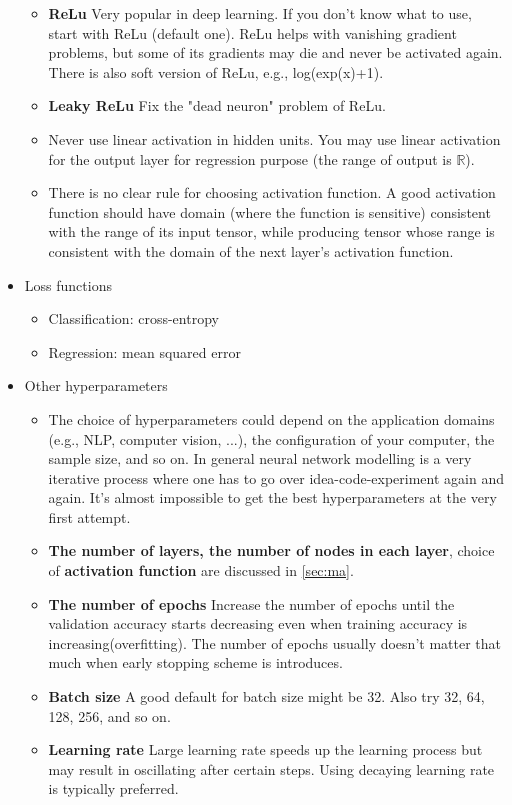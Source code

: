\begin{itemize}
\begin{itemize}
    \item \textbf{ReLu} Very popular in deep learning.  If you don't know what to use, start with ReLu (default one). ReLu helps with vanishing gradient problems, but some of its gradients may die and never be activated again. There is also soft version of ReLu, e.g., log(exp(x)+1).  
    \item \textbf{Leaky ReLu} Fix the "dead neuron" problem of ReLu. 
    \item Never use linear activation in hidden units. You may use linear activation for the output layer for regression purpose (the range of output is $\mathbb{R}$).
    \item There is no clear rule for choosing activation function. A good activation function should have domain (where the function is sensitive) consistent with the range of its input tensor, while producing tensor whose range is consistent with the domain of the next layer's activation function. 
\end{itemize}
\item Loss functions
\begin{itemize}
    \item Classification: cross-entropy
    \item Regression: mean squared error
\end{itemize}
\item Other hyperparameters
\begin{itemize}
    \item The choice of hyperparameters could depend on the application domains (e.g., NLP, computer vision, ...), the configuration of your computer, the sample size, and so on. In general neural network modelling is a very iterative process where one has to go over idea-code-experiment again and again. It's almost impossible to get the best hyperparameters at the very first attempt. 
    \item \textbf{The number of layers, the number of nodes in each layer}, choice of \textbf{activation function} are discussed in \ref{sec:ma}.
    \item \textbf{The number of epochs} Increase the number of epochs until the validation accuracy starts decreasing even when training accuracy is increasing(overfitting). The number of epochs usually doesn't matter that much when early stopping scheme is introduces. 
    \item \textbf{Batch size} A good default for batch size might be 32. Also try 32, 64, 128, 256, and so on.
    \item \textbf{Learning rate} Large learning rate speeds up the learning process but may result in oscillating after certain steps. Using decaying learning rate is typically preferred. 
\end{itemize}
\end{itemize}



